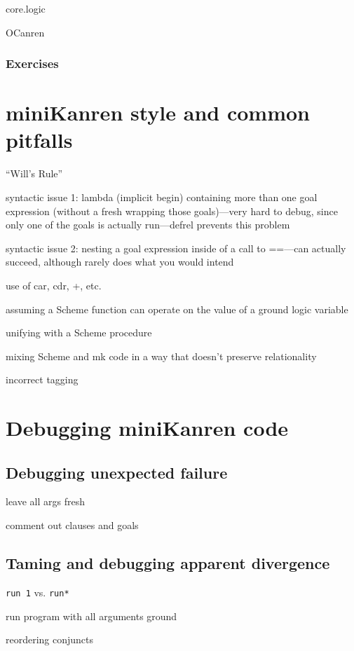 \documentclass{book}
\begin{document}
core.logic

OCanren

\subsection{Exercises}


\chapter{miniKanren style and common pitfalls}%

``Will's Rule''

syntactic issue 1:
lambda (implicit begin) containing more than one goal expression (without a fresh wrapping those goals)---very hard to debug, since only one of the goals is actually run---defrel prevents this problem

syntactic issue 2:
nesting a goal expression inside of a call to ==---can actually succeed, although rarely does what you would intend

use of car, cdr, +, etc.

assuming a Scheme function can operate on the value of a ground logic variable

unifying with a Scheme procedure

mixing Scheme and mk code in a way that doesn't preserve relationality

incorrect tagging

\chapter{Debugging miniKanren code}%

\section{Debugging unexpected failure}

leave all args fresh

comment out clauses and goals

\section{Taming and debugging apparent divergence}

\verb|run 1| vs. \verb|run*|

run program with all arguments ground

reordering conjuncts
\end{document}
